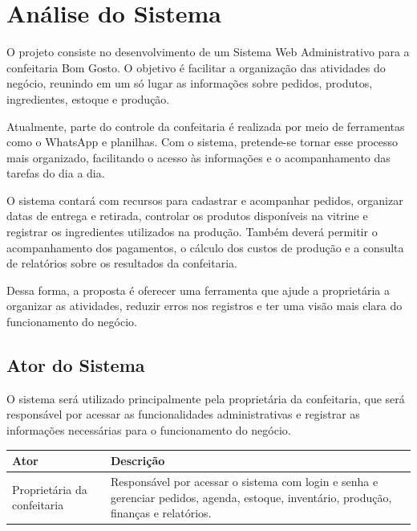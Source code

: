\chapter{Análise do Sistema}

O projeto consiste no desenvolvimento de um Sistema Web Administrativo para a confeitaria Bom Gosto. O objetivo é facilitar a organização das atividades do negócio, reunindo em um só lugar as informações sobre pedidos, produtos, ingredientes, estoque e produção.

Atualmente, parte do controle da confeitaria é realizada por meio de ferramentas como o WhatsApp e planilhas. Com o sistema, pretende-se tornar esse processo mais organizado, facilitando o acesso às informações e o acompanhamento das tarefas do dia a dia.

O sistema contará com recursos para cadastrar e acompanhar pedidos, organizar datas de entrega e retirada, controlar os produtos disponíveis na vitrine e registrar os ingredientes utilizados na produção. Também deverá permitir o acompanhamento dos pagamentos, o cálculo dos custos de produção e a consulta de relatórios sobre os resultados da confeitaria.

Dessa forma, a proposta é oferecer uma ferramenta que ajude a proprietária a organizar as atividades, reduzir erros nos registros e ter uma visão mais clara do funcionamento do negócio.


\section{Ator do Sistema}

O sistema será utilizado principalmente pela proprietária da confeitaria, que será responsável por acessar as funcionalidades administrativas e registrar as informações necessárias para o funcionamento do negócio.

\begin{quadro}
    \centering
    \label{quadro:ator_sistema}

    \begin{tabular}{|p{5cm}|p{8cm}|}
        \hline
        \textbf{Ator} & \textbf{Descrição} \\ \hline
        Proprietária da confeitaria &
        Responsável por acessar o sistema com login e senha e gerenciar pedidos, agenda, estoque, inventário, produção, finanças e relatórios. \\ \hline
    \end{tabular}

    \vspace{0.2cm}
\end{quadro}

